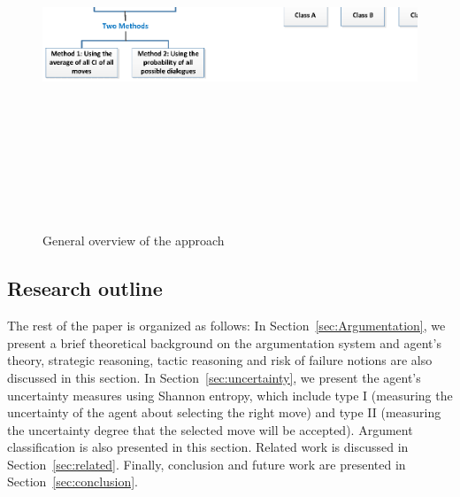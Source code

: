 \begin{figure}[t]
                \begin{center}
                \includegraphics[width=15cm, height=11cm]{Figures/Approach1.eps}
                \end{center}
                \caption{General overview of the approach}\label{fig1.0}
                \label{Stack}
                \end{figure}


\subsection{Research outline}\label{sec:outline}
The rest of the paper is organized as follows: In Section~\ref{sec:Argumentation}, we present a  brief theoretical background on the argumentation system
and agent's theory, strategic reasoning, tactic reasoning and risk of failure notions are also discussed in this section. In Section~\ref{sec:uncertainty},
we present the agent's uncertainty measures using Shannon entropy, which include type I (measuring the uncertainty of the agent about selecting the right move)
and type II (measuring the uncertainty degree that the selected move will be accepted). Argument classification is also presented in this section. Related work
is discussed in Section~\ref{sec:related}. Finally, conclusion and future work are presented in Section~\ref{sec:conclusion}.







